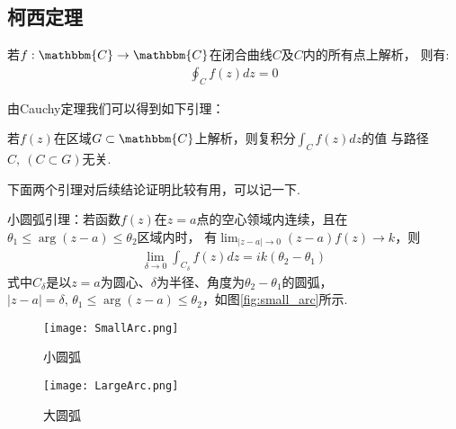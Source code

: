     \subsection{柯西定理}
        \begin{theorem}[Cauchy 定理]\label{thm:cauchy_theorem}
            若$f:\mathbbm{C}\to\mathbbm{C}$在闭合曲线$C$及$C$内的所有点上解析，
            则有:
            \begin{align*}
                \oint_{C}f(z)dz = 0
            \end{align*}
        \end{theorem}

        由Cauchy定理我们可以得到如下引理：
        \begin{lemma}
            若$f(z)$在区域$G\subset\mathbbm{C}$上解析，则复积分$\int_{C}f(z)dz$的值
            与路径$C,\ (C \subset G)$无关.
        \end{lemma}

        下面两个引理对后续结论证明比较有用，可以记一下.
        \begin{lemma}
            \label{lem:small_arc_lemma}
            小圆弧引理：若函数$f(z)$在$z = a$点的空心领域内连续，且在$\theta_1 \leq \arg{(z - a)} \leq \theta_2$区域内时，
            有$\lim_{|z - a| \to 0}(z - a)f(z) \to k$，则
            \begin{align*}
                \lim_{\delta \to 0}\int_{C_\delta}f(z)dz = ik(\theta_2 - \theta_1)
            \end{align*}
            式中$C_\delta$是以$z = a$为圆心、$\delta$为半径、角度为$\theta_2 - \theta_1$的圆弧，
            $|z - a| = \delta,\,\theta_1 \leq \arg{(z - a)} \leq \theta_2$，如图\ref{fig:small_arc}所示.
        \end{lemma}

        \begin{figure}[htbp]
            \centering
            \begin{minipage}[t]{0.48\textwidth}
                \centering
                \texttt{[image: SmallArc.png]}
                \caption{小圆弧}
                \label{fig:small_arc}
            \end{minipage}
            \begin{minipage}[t]{0.48\textwidth}
                \centering
                \texttt{[image: LargeArc.png]}
                \caption{大圆弧}
                \label{fig:large_arc}
            \end{minipage}
        \end{figure}

